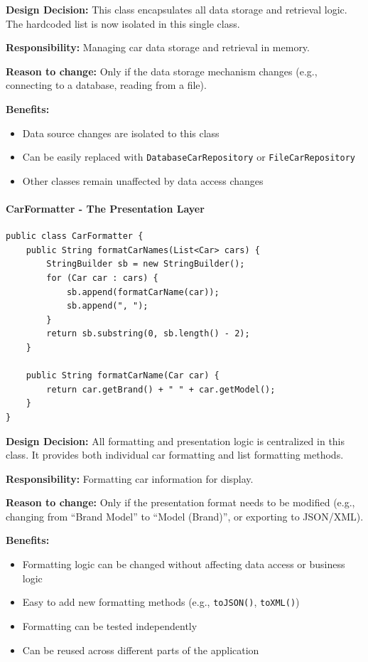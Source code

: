 \textbf{Design Decision:} This class encapsulates all data storage and retrieval logic. The hardcoded list is now isolated in this single class.

\textbf{Responsibility:} Managing car data storage and retrieval in memory.

\textbf{Reason to change:} Only if the data storage mechanism changes (e.g., connecting to a database, reading from a file).

\textbf{Benefits:}
\begin{itemize}
    \item Data source changes are isolated to this class
    \item Can be easily replaced with \texttt{DatabaseCarRepository} or \texttt{FileCarRepository}
    \item Other classes remain unaffected by data access changes
\end{itemize}

\paragraph{CarFormatter - The Presentation Layer}

\begin{verbatim}
public class CarFormatter {
    public String formatCarNames(List<Car> cars) {
        StringBuilder sb = new StringBuilder();
        for (Car car : cars) {
            sb.append(formatCarName(car));
            sb.append(", ");
        }
        return sb.substring(0, sb.length() - 2);
    }
    
    public String formatCarName(Car car) {
        return car.getBrand() + " " + car.getModel();
    }
}
\end{verbatim}

\textbf{Design Decision:} All formatting and presentation logic is centralized in this class. It provides both individual car formatting and list formatting methods.

\textbf{Responsibility:} Formatting car information for display.

\textbf{Reason to change:} Only if the presentation format needs to be modified (e.g., changing from ``Brand Model'' to ``Model (Brand)'', or exporting to JSON/XML).

\textbf{Benefits:}
\begin{itemize}
    \item Formatting logic can be changed without affecting data access or business logic
    \item Easy to add new formatting methods (e.g., \texttt{toJSON()}, \texttt{toXML()})
    \item Formatting can be tested independently
    \item Can be reused across different parts of the application
\end{itemize}

